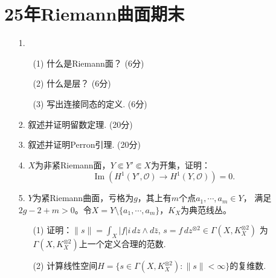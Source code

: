 \section{25年Riemann曲面期末}
\begin{enumerate}
    \item[1.]
    \begin{enumerate}
        \item[(1)] 什么是Riemann面？ (6分)
        \item[(2)] 什么是层？ (6分)
        \item[(3)] 写出连接同态的定义. (6分)
    \end{enumerate}

    \item[2.] 叙述并证明留数定理. (20分)

    \item[3.] 叙述并证明Perron引理. (20分)

    \item[4.] $X$为非紧Riemann面，$Y \Subset Y' \Subset X$为开集，证明：
    $$\operatorname{Im}(H^1(Y',\mathcal{O})\rightarrow H^1(Y,\mathcal{O}))=0.$$

    \item[5.]$ Y$为紧Riemann曲面，亏格为$g$，其上有$m$个点$a_1,\cdots,a_m\in Y$，
    满足$2g-2+m>0$。令$X=Y\setminus\{a_1,\cdots,a_m\}$，$K_X$为典范线丛。
    \begin{enumerate}
        \item[(1)] 证明：$\|s\|=\int_X|f|i\,dz \wedge d\bar{z}$,
        $s=f\,dz^{\otimes2}\in\Gamma(X,K_X^{\otimes2})$
        为$\Gamma(X,K_X^{\otimes2})$上一个定义合理的范数.

        \item[(2)] 计算线性空间$H=\{s\in\Gamma(X,K_X^{\otimes2}):\|s\|<\infty\}$的复维数.
    \end{enumerate}
\end{enumerate}